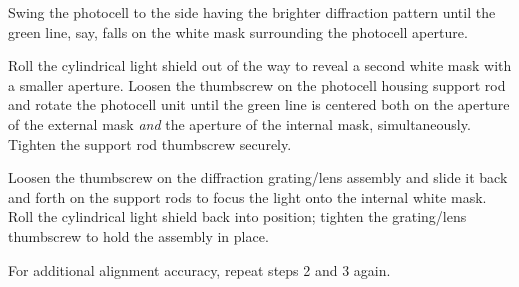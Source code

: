 \begin{tight_enumerate}
\item Swing the photocell to the side having the brighter diffraction
pattern until the green line, say, falls on the white mask surrounding
the photocell aperture.

\item Roll the cylindrical light shield out of the way to reveal a second
white mask with a smaller aperture. Loosen the thumbscrew on the
photocell housing support rod and rotate the photocell unit until the
green line is centered both on the aperture of the external mask
\emph{and} the aperture of the internal mask, simultaneously. Tighten
the support rod thumbscrew securely.

\item Loosen the thumbscrew on the diffraction grating/lens assembly and
slide it back and forth on the support rods to focus the light onto the
internal white mask. Roll the cylindrical light shield back into
position; tighten the grating/lens thumbscrew to hold the assembly in
place.

\item For additional alignment accuracy, repeat steps 2 and 3 again.
\end{tight_enumerate}
